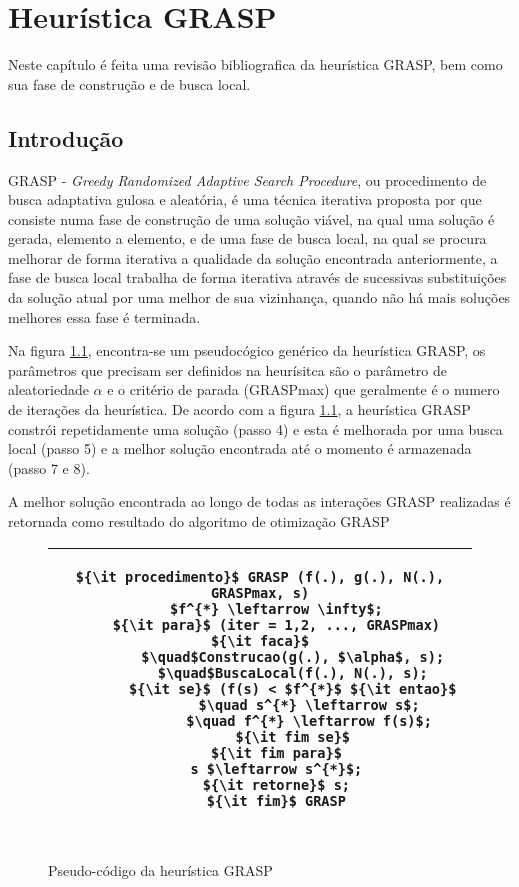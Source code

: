
\chapter{Heurística GRASP}\label{grasp}
Neste capítulo é feita uma revisão bibliografica da heurística GRASP, bem como sua fase de construção e de busca local.

\section{Introdução}
GRASP - {\it Greedy Randomized Adaptive Search Procedure}, ou procedimento de busca adaptativa gulosa e aleatória, é uma técnica iterativa proposta por  que consiste numa fase de construção de uma solução viável, na qual uma solução é gerada, elemento a elemento, e de uma fase de busca local, na qual se procura melhorar de forma iterativa a qualidade da solução encontrada anteriormente, a fase de busca local trabalha de forma iterativa através de sucessivas substituições da solução atual por uma melhor de sua vizinhança, quando não há mais soluções melhores essa fase é terminada.

Na figura \ref{proc_grasp}, encontra-se um pseudocógico genérico da heurística GRASP, os parâmetros que precisam ser definidos na heurísitca são o parâmetro de aleatoriedade $\alpha$ e o critério de parada (GRASPmax) que geralmente é o numero de iterações da heurística. De acordo com a figura \ref{proc_grasp}, a heurística GRASP constrói repetidamente uma solução (passo 4) e esta é melhorada por uma busca local (passo 5) e a melhor solução encontrada até o momento é armazenada (passo 7 e 8).

A melhor solução encontrada ao longo de todas as interações GRASP realizadas é retornada como resultado do algoritmo de otimização GRASP \cite{SOUZA}


\begin{figure}[H]
    \begin{center}
       \begin{tabular}{c} \hline
        \begin{lstlisting}[mathescape] 
	${\it procedimento}$ GRASP (f(.), g(.), N(.), GRASPmax, s)
	$f^{*} \leftarrow \infty$;
	${\it para}$ (iter = 1,2, ..., GRASPmax) ${\it faca}$
		$\quad$Construcao(g(.), $\alpha$, s);
		$\quad$BuscaLocal(f(.), N(.), s);
		${\it se}$ (f(s) < $f^{*}$ ${\it entao}$
			$\quad s^{*} \leftarrow s$;
			$\quad f^{*} \leftarrow f(s)$;
		${\it fim se}$
	${\it fim para}$
	s $\leftarrow s^{*}$;
	${\it retorne}$ s;
	${\it fim}$ GRASP
	
	\end{lstlisting}

\\
\hline
 \end{tabular}
 \end{center}
\caption{Pseudo-código da heurística GRASP}
\label{proc_grasp}
 \end{figure}

